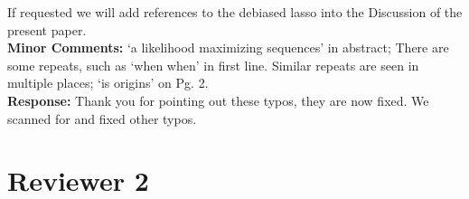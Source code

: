 \documentclass[12pt]{article}
\begin{document}
\vspace*{0.5cm} If requested we will add references to the debiased lasso into the Discussion of the present paper. \\



{\bf Minor Comments:} ‘a likelihood maximizing sequences’ in abstract;
There are some repeats, such as ‘when when’ in first line. Similar repeats are seen in multiple places; ‘is origins’ on Pg. 2. \\

{\bf Response:} Thank you for pointing out these typos, they are now fixed. We scanned for and fixed other typos. 



\newpage
\section*{Reviewer 2}
\end{document}
